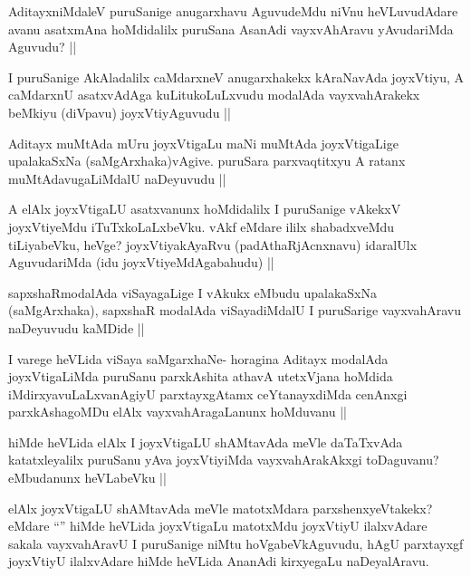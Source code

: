 \begin{artha}
AditayxniMdaleV puruSanige anugarxhavu AguvudeMdu niVnu heVLuvudAdare avanu asatxmAna hoMdidalilx puruSana AsanAdi vayxvAhAravu yAvudariMda Aguvudu? ||
\end{artha}

\begin{artha}
I puruSanige AkAladalilx caMdarxneV anugarxhakekx kAraNavAda joyxVtiyu, A caMdarxnU asatxvAdAga kuLitukoLuLxvudu modalAda vayxvahArakekx beMkiyu (diVpavu) joyxVtiyAguvudu ||
\end{artha}

\begin{artha}
Aditayx muMtAda mUru joyxVtigaLu maNi muMtAda joyxVtigaLige upalakaSxNa (saMgArxhaka)vAgive. puruSara parxvaqtitxyu A ratanx muMtAdavugaLiMdalU naDeyuvudu ||
\end{artha}

\begin{artha}
A elAlx joyxVtigaLU asatxvanunx hoMdidalilx I puruSanige vAkekxV joyxVtiyeMdu iTuTxkoLaLxbeVku. vAkf eMdare ililx shabadxveMdu tiLiyabeVku, heVge? joyxVtiyakAyaRvu (padAthaRjAcnxnavu) idaralUlx AguvudariMda (idu joyxVtiyeMdAgabahudu) ||
\end{artha}

\begin{artha}
sapxshaRmodalAda viSayagaLige I vAkukx eMbudu upalakaSxNa (saMgArxhaka), sapxshaR modalAda viSayadiMdalU I puruSarige vayxvahAravu naDeyuvudu kaMDide ||
\end{artha}

\begin{artha}
I varege heVLida viSaya saMgarxhaNe- horagina Aditayx modalAda joyxVtigaLiMda puruSanu parxkAshita athavA utetxVjana hoMdida iMdirxyavuLaLxvanAgiyU parxtayxgAtamx ceYtanayxdiMda cenAnxgi parxkAshagoMDu elAlx vayxvahAragaLanunx hoMduvanu ||
\end{artha}

\begin{artha}
hiMde heVLida elAlx I joyxVtigaLU shAMtavAda meVle daTaTxvAda katatxleyalilx puruSanu yAva joyxVtiyiMda vayxvahArakAkxgi toDaguvanu? eMbudanunx heVLabeVku ||
\end{artha}

\begin{artha}
elAlx joyxVtigaLU shAMtavAda meVle matotxMdara parxshenxyeVtakekx? eMdare ``\stext'' hiMde heVLida joyxVtigaLu matotxMdu joyxVtiyU ilalxvAdare sakala vayxvahAravU I puruSanige niMtu hoVgabeVkAguvudu, hAgU parxtayxgf joyxVtiyU ilalxvAdare hiMde heVLida AnanAdi kirxyegaLu naDeyalAravu.
\end{artha}

